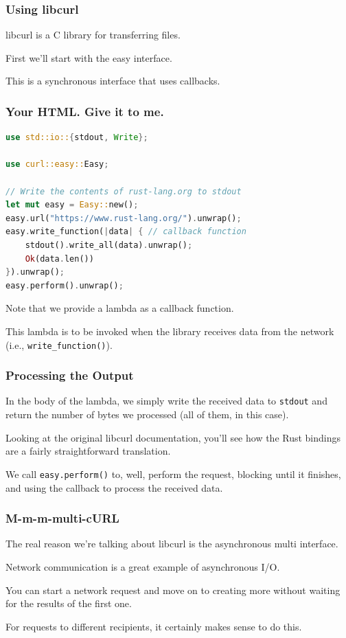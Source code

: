 \begin{frame}
\frametitle{Using libcurl}

libcurl is a C library for transferring files. 

First we'll start with the easy interface. 

This is a synchronous interface
that uses callbacks. 

\end{frame}


\begin{frame}[fragile]
\frametitle{Your HTML. Give it to me.}

\begin{lstlisting}[language=Rust]
use std::io::{stdout, Write};

use curl::easy::Easy;

// Write the contents of rust-lang.org to stdout
let mut easy = Easy::new();
easy.url("https://www.rust-lang.org/").unwrap();
easy.write_function(|data| { // callback function
    stdout().write_all(data).unwrap();
    Ok(data.len())
}).unwrap();
easy.perform().unwrap();
\end{lstlisting}

Note that we provide a lambda as a callback function. 

This lambda is to be invoked
when the library receives data from the network (i.e., \texttt{write\_function()}).

\end{frame}


\begin{frame}
\frametitle{Processing the Output}

In the body of the lambda, we simply write the received data to \texttt{stdout}
and return the number of bytes we processed (all of them, in this case).


Looking at the original libcurl documentation, you'll see how the Rust bindings are a fairly straightforward translation.

We call \texttt{easy.perform()} to, well, perform the request, blocking until it finishes, and using the callback to process the received data.


\end{frame}


\begin{frame}
\frametitle{M-m-m-multi-cURL}
The real reason we're talking about libcurl is the asynchronous multi interface.

Network communication is a great example of asynchronous I/O.


You can start a network request and move on to creating more without waiting for the results of the first one. 

For requests to different recipients, it certainly makes sense to do this.

\end{frame}



